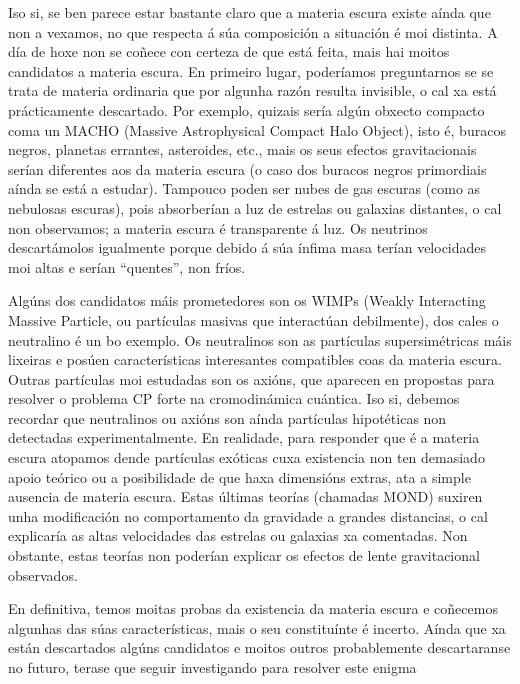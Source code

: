 \begin{refsection}
\begin{multicols}{2}
Iso si, se ben parece estar bastante claro que a materia escura existe aínda que non a vexamos, no que respecta á súa composición a situación é moi distinta. A día de hoxe non se coñece con certeza de que está feita, mais hai moitos candidatos a materia escura. En primeiro lugar, poderíamos preguntarnos se se trata de materia ordinaria que por algunha razón resulta invisible, o cal xa está prácticamente descartado. Por exemplo, quizais sería algún obxecto compacto coma un MACHO (Massive Astrophysical Compact Halo Object), isto é, buracos negros, planetas errantes, asteroides, etc., mais os seus efectos gravitacionais serían diferentes aos da materia escura (o caso dos buracos negros primordiais aínda se está a estudar). Tampouco poden ser nubes de gas escuras (como as nebulosas escuras), pois absorberían a luz de estrelas ou galaxias distantes, o cal non observamos; a materia escura é transparente á luz. Os neutrinos descartámolos igualmente porque debido á súa ínfima masa terían velocidades moi altas e serían “quentes”, non fríos.

Algúns dos candidatos máis prometedores son os WIMPs (Weakly Interacting Massive Particle, ou partículas masivas que interactúan debilmente), dos cales o neutralino é un bo exemplo. Os neutralinos son as partículas supersimétricas máis lixeiras e posúen características interesantes compatibles coas da materia escura. Outras partículas moi estudadas son os axións, que aparecen en propostas para resolver o problema CP forte na cromodinámica cuántica. Iso si, debemos recordar que neutralinos ou axións son aínda partículas hipotéticas non detectadas experimentalmente. En realidade, para responder que é a materia escura atopamos dende partículas exóticas cuxa existencia non ten demasiado apoio teórico ou a posibilidade de que haxa dimensións extras, ata a simple ausencia de materia escura. Estas últimas teorías (chamadas MOND) suxiren unha modificación no comportamento da gravidade a grandes distancias, o cal explicaría as altas velocidades das estrelas ou galaxias xa comentadas. Non obstante, estas teorías non poderían explicar os efectos de lente gravitacional observados.

En definitiva, temos moitas probas da existencia da materia escura e coñecemos algunhas das súas características, mais o seu constituínte é incerto. Aínda que xa están descartados algúns candidatos e moitos outros probablemente descartaranse no futuro, terase que seguir investigando para resolver este enigma


\nocite{alberto2021materiaescura}
\nocite{krauss5esencia}
\nocite{hubbleNASA}
\nocite{hubbleNASA2}
\printbibliography


\end{multicols}
\end{refsection}